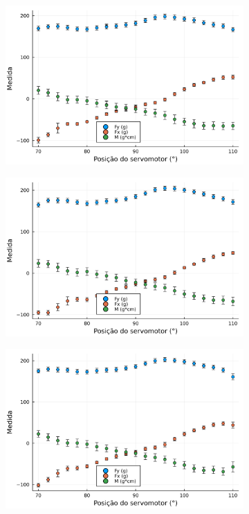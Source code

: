 \begin{figure}[htbp]
\begin{subfigure}{0.49\textwidth}
    \end{subfigure}
    \begin{subfigure}{0.49\textwidth}
        \includegraphics[width=\textwidth]{img/results/exp10_5bar_110_a_70.png}
    \end{subfigure}
    \begin{subfigure}{0.49\textwidth}
        \includegraphics[width=\textwidth]{img/results/exp11_5bar_70_a_110.png}
    \end{subfigure}
    \begin{subfigure}{0.49\textwidth}
        \includegraphics[width=\textwidth]{img/results/exp12_5bar_110_a_70.png}

\end{subfigure}
\end{figure}
